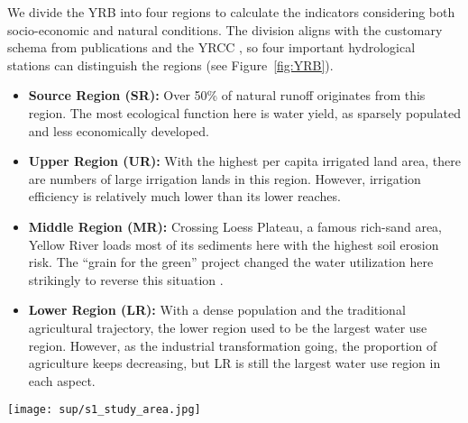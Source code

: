We divide the YRB into four regions to calculate the indicators considering both socio-economic and natural conditions. The division aligns with the customary schema from publications and the YRCC \cite{yellowriverconservancycommission2013,wang2019c,wang2016e}, so four important hydrological stations can distinguish the regions (see Figure~\ref{fig:YRB}).

\begin{itemize}
    \item \textbf{Source Region (SR):} Over 50\% of natural runoff originates from this region. The most ecological function here is water yield, as sparsely populated and less economically developed.
    \item \textbf{Upper Region (UR):} With the highest per capita irrigated land area, there are numbers of large irrigation lands in this region. However, irrigation efficiency is relatively much lower than its lower reaches.
    \item \textbf{Middle Region (MR):} Crossing Loess Plateau, a famous rich-sand area, Yellow River loads most of its sediments here with the highest soil erosion risk. The ``grain for the green'' project changed the water utilization here strikingly to reverse this situation \cite{wu2020a}.
    \item \textbf{Lower Region (LR):} With a dense population and the traditional agricultural trajectory, the lower region used to be the largest water use region. However, as the industrial transformation going, the proportion of agriculture keeps decreasing, but LR is still the largest water use region in each aspect.
\end{itemize}

\begin{figure*}[hbtp!]
    \centering
    \texttt{[image: sup/s1\_study\_area.jpg]}
    \caption{
        The study area.
        \textbf{A.} Diagram of the YRB and the subdivision of the basin (SR: Source Region, UR: Upper Region, MR: Middle Region, DR: Downstream region).
        \textbf{B.} Profile of the main channel of the Yellow River. The hydrological stations control the SR, UR, MR and DR.
        \textbf{C.} Typical landscapes in different regions in the YRB.
    }
    \label{fig:YRB}
\end{figure*}

